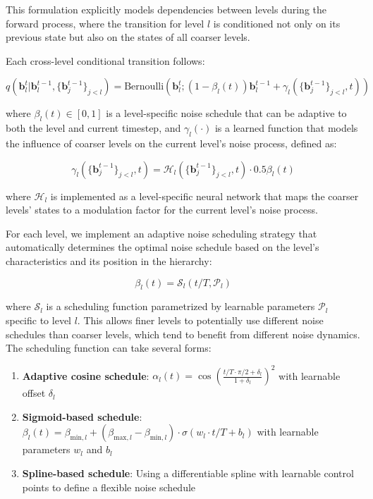 \documentclass[10pt,twocolumn,letterpaper]{article}
\newcommand{\bm}[1]{\boldsymbol{#1}}
\newcommand{\binary}{\bm{b}}
\newcommand{\Bernoulli}{\text{Bernoulli}}
\begin{document}
This formulation explicitly models dependencies between levels during the forward process, where the transition for level $l$ is conditioned not only on its previous state but also on the states of all coarser levels.

Each cross-level conditional transition follows:

\begin{equation}
q(\binary_l^t|\binary_l^{t-1}, \{\binary_j^{t-1}\}_{j<l}) = \Bernoulli(\binary_l^t; (1-\beta_l(t))\binary_l^{t-1} + \gamma_l(\{\binary_j^{t-1}\}_{j<l}, t))
\end{equation}

where $\beta_l(t) \in [0,1]$ is a level-specific noise schedule that can be adaptive to both the level and current timestep, and $\gamma_l(\cdot)$ is a learned function that models the influence of coarser levels on the current level's noise process, defined as:

\begin{equation}
\gamma_l(\{\binary_j^{t-1}\}_{j<l}, t) = \mathcal{H}_l(\{\binary_j^{t-1}\}_{j<l}, t) \cdot 0.5\beta_l(t)
\end{equation}

where $\mathcal{H}_l$ is implemented as a level-specific neural network that maps the coarser levels' states to a modulation factor for the current level's noise process.

For each level, we implement an adaptive noise scheduling strategy that automatically determines the optimal noise schedule based on the level's characteristics and its position in the hierarchy:

\begin{equation}
\beta_l(t) = \mathcal{S}_l(t/T, \mathcal{P}_l)
\end{equation}

where $\mathcal{S}_l$ is a scheduling function parametrized by learnable parameters $\mathcal{P}_l$ specific to level $l$. This allows finer levels to potentially use different noise schedules than coarser levels, which tend to benefit from different noise dynamics. The scheduling function can take several forms:

\begin{enumerate}
    \item \textbf{Adaptive cosine schedule}: $\alpha_l(t) = \cos\left(\frac{t/T \cdot \pi/2 + \delta_l}{1 + \delta_l}\right)^2$ with learnable offset $\delta_l$
    \item \textbf{Sigmoid-based schedule}: $\beta_l(t) = \beta_{\text{min},l} + (\beta_{\text{max},l} - \beta_{\text{min},l}) \cdot \sigma(w_l \cdot t/T + b_l)$ with learnable parameters $w_l$ and $b_l$
    \item \textbf{Spline-based schedule}: Using a differentiable spline with learnable control points to define a flexible noise schedule
\end{enumerate}
\end{document}
